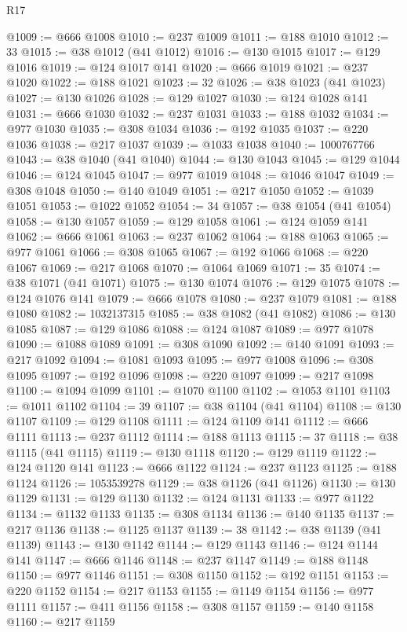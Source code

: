 \begin{lexlean}{R17}
\begin{coremodule}
@1009 := @666 @1008
@1010 := @237 @1009
@1011 := @188 @1010
@1012 := 33
@1015 := @38 @1012 (@41 @1012)
@1016 := @130 @1015
@1017 := @129 @1016
@1019 := @124 @1017 @141
@1020 := @666 @1019
@1021 := @237 @1020
@1022 := @188 @1021
@1023 := 32
@1026 := @38 @1023 (@41 @1023)
@1027 := @130 @1026
@1028 := @129 @1027
@1030 := @124 @1028 @141
@1031 := @666 @1030
@1032 := @237 @1031
@1033 := @188 @1032
@1034 := @977 @1030
@1035 := @308 @1034
@1036 := @192 @1035
@1037 := @220 @1036
@1038 := @217 @1037
@1039 := @1033 @1038
@1040 := 1000767766
@1043 := @38 @1040 (@41 @1040)
@1044 := @130 @1043
@1045 := @129 @1044
@1046 := @124 @1045
@1047 := @977 @1019
@1048 := @1046 @1047
@1049 := @308 @1048
@1050 := @140 @1049
@1051 := @217 @1050
@1052 := @1039 @1051
@1053 := @1022 @1052
@1054 := 34
@1057 := @38 @1054 (@41 @1054)
@1058 := @130 @1057
@1059 := @129 @1058
@1061 := @124 @1059 @141
@1062 := @666 @1061
@1063 := @237 @1062
@1064 := @188 @1063
@1065 := @977 @1061
@1066 := @308 @1065
@1067 := @192 @1066
@1068 := @220 @1067
@1069 := @217 @1068
@1070 := @1064 @1069
@1071 := 35
@1074 := @38 @1071 (@41 @1071)
@1075 := @130 @1074
@1076 := @129 @1075
@1078 := @124 @1076 @141
@1079 := @666 @1078
@1080 := @237 @1079
@1081 := @188 @1080
@1082 := 1032137315
@1085 := @38 @1082 (@41 @1082)
@1086 := @130 @1085
@1087 := @129 @1086
@1088 := @124 @1087
@1089 := @977 @1078
@1090 := @1088 @1089
@1091 := @308 @1090
@1092 := @140 @1091
@1093 := @217 @1092
@1094 := @1081 @1093
@1095 := @977 @1008
@1096 := @308 @1095
@1097 := @192 @1096
@1098 := @220 @1097
@1099 := @217 @1098
@1100 := @1094 @1099
@1101 := @1070 @1100
@1102 := @1053 @1101
@1103 := @1011 @1102
@1104 := 39
@1107 := @38 @1104 (@41 @1104)
@1108 := @130 @1107
@1109 := @129 @1108
@1111 := @124 @1109 @141
@1112 := @666 @1111
@1113 := @237 @1112
@1114 := @188 @1113
@1115 := 37
@1118 := @38 @1115 (@41 @1115)
@1119 := @130 @1118
@1120 := @129 @1119
@1122 := @124 @1120 @141
@1123 := @666 @1122
@1124 := @237 @1123
@1125 := @188 @1124
@1126 := 1053539278
@1129 := @38 @1126 (@41 @1126)
@1130 := @130 @1129
@1131 := @129 @1130
@1132 := @124 @1131
@1133 := @977 @1122
@1134 := @1132 @1133
@1135 := @308 @1134
@1136 := @140 @1135
@1137 := @217 @1136
@1138 := @1125 @1137
@1139 := 38
@1142 := @38 @1139 (@41 @1139)
@1143 := @130 @1142
@1144 := @129 @1143
@1146 := @124 @1144 @141
@1147 := @666 @1146
@1148 := @237 @1147
@1149 := @188 @1148
@1150 := @977 @1146
@1151 := @308 @1150
@1152 := @192 @1151
@1153 := @220 @1152
@1154 := @217 @1153
@1155 := @1149 @1154
@1156 := @977 @1111
@1157 := @411 @1156
@1158 := @308 @1157
@1159 := @140 @1158
@1160 := @217 @1159

\end{coremodule}
\end{lexlean}
